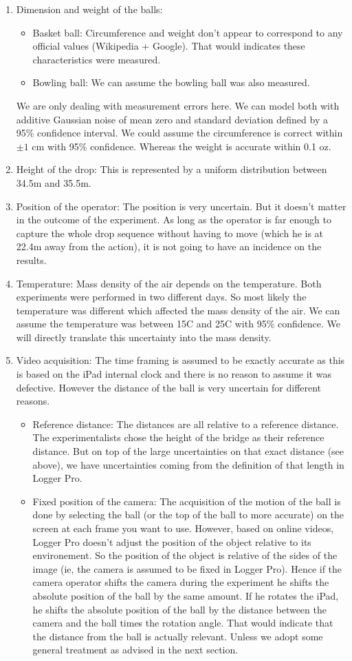 \documentclass{article}
\begin{document}
\begin{enumerate}
 \item Dimension and weight of the balls:
\begin{itemize}
 \item Basket ball: Circumference and weight don't appear to correspond to any official values (Wikipedia + Google). That would indicates these characteristics were measured.
 \item Bowling ball: We can assume the bowling ball was also measured.
\end{itemize}
We are only dealing with measurement errors here. We can model both with additive Gaussian noise of mean zero and standard deviation defined by a 95\% confidence interval. We could assume the circumference is correct within $\pm 1$ cm with 95\% confidence. Whereas the weight is accurate within 0.1 oz.
 \item Height of the drop: This is represented by a uniform distribution between 34.5m and 35.5m.
 \item Position of the operator: The position is very uncertain. But it doesn't matter in the outcome of the experiment. As long as the operator is far enough to capture the whole drop sequence without having to move (which he is at 22.4m away from the action), it is not going to have an incidence on the results.
 \item Temperature: Mass density of the air depends on the temperature. Both experiments were performed in two different days. So most likely the temperature was different which affected the mass density of the air. We can assume the temperature was between 15C and 25C with 95\% confidence. We will directly translate this uncertainty into the mass density.
 \item Video acquisition: The time framing is assumed to be exactly accurate as this is based on the iPad internal clock and there is no reason to assume it was defective. However the distance of the ball is very uncertain for different reasons.
\begin{itemize}
 \item Reference distance: The distances are all relative to a reference distance. The experimentalists chose the height of the bridge as their reference distance. But on top of the large uncertainties on that exact distance (see above), we have uncertainties coming from the definition of that length in Logger Pro.
 \item Fixed position of the camera: The acquisition of the motion of the ball is done by selecting the ball (or the top of the ball to more accurate) on the screen at each frame you want to use. However, based on online videos, Logger Pro doesn't adjust the position of the object relative to its environement. So the position of the object is relative of the sides of the image (ie, the camera is assumed to be fixed in Logger Pro). Hence if the camera operator shifts the camera during the experiment he shifts the absolute position of the ball by the same amount. If he rotates the iPad, he shifts the absolute position of the ball by the distance between the camera and the ball times the rotation angle. That would indicate that the distance from the ball is actually relevant. Unless we adopt some general treatment as advised in the next section.

\end{itemize}
\end{enumerate}
\end{document}
